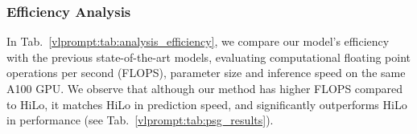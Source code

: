 \subsubsection{Efficiency Analysis}

\begin{table}[!t]
    \centering
    \setlength{\tabcolsep}{1.6mm}
    \caption{Analysis for efficiency.
    Our method achieves significant performance improvements without introducing notable efficiency issues, maintaining a comparable level to previous approaches.
    }
    \label{vlprompt:tab:analysis_efficiency}
\end{table}

In Tab.~\ref{vlprompt:tab:analysis_efficiency}, we compare our model's efficiency with the previous state-of-the-art models, evaluating computational floating point operations per second (FLOPS), parameter size and inference speed on the same A100 GPU.
We observe that although our method has higher FLOPS compared to HiLo, it matches HiLo in prediction speed, and significantly outperforms HiLo in performance (see Tab.~\ref{vlprompt:tab:psg_results}).
